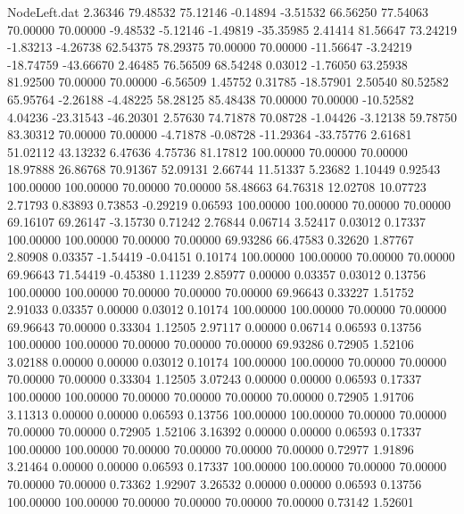 \begin{filecontents}{NodeLeft.dat}
   2.36346   79.48532   75.12146    -0.14894   -3.51532   66.56250   77.54063   70.00000   70.00000   -9.48532   -5.12146   -1.49819  -35.35985
   2.41414   81.56647   73.24219    -1.83213   -4.26738   62.54375   78.29375   70.00000   70.00000  -11.56647   -3.24219  -18.74759  -43.66670
   2.46485   76.56509   68.54248     0.03012   -1.76050   63.25938   81.92500   70.00000   70.00000   -6.56509    1.45752    0.31785  -18.57901
   2.50540   80.52582   65.95764    -2.26188   -4.48225   58.28125   85.48438   70.00000   70.00000  -10.52582    4.04236  -23.31543  -46.20301
   2.57630   74.71878   70.08728    -1.04426   -3.12138   59.78750   83.30312   70.00000   70.00000   -4.71878   -0.08728  -11.29364  -33.75776
   2.61681   51.02112   43.13232     6.47636    4.75736   81.17812  100.00000   70.00000   70.00000   18.97888   26.86768   70.91367   52.09131
   2.66744   11.51337    5.23682     1.10449    0.92543  100.00000  100.00000   70.00000   70.00000   58.48663   64.76318   12.02708   10.07723
   2.71793    0.83893    0.73853    -0.29219    0.06593  100.00000  100.00000   70.00000   70.00000   69.16107   69.26147   -3.15730    0.71242
   2.76844    0.06714    3.52417     0.03012    0.17337  100.00000  100.00000   70.00000   70.00000   69.93286   66.47583    0.32620    1.87767
   2.80908    0.03357   -1.54419    -0.04151    0.10174  100.00000  100.00000   70.00000   70.00000   69.96643   71.54419   -0.45380    1.11239
   2.85977    0.00000    0.03357     0.03012    0.13756  100.00000  100.00000   70.00000   70.00000   70.00000   69.96643    0.33227    1.51752
   2.91033    0.03357    0.00000     0.03012    0.10174  100.00000  100.00000   70.00000   70.00000   69.96643   70.00000    0.33304    1.12505
   2.97117    0.00000    0.06714     0.06593    0.13756  100.00000  100.00000   70.00000   70.00000   70.00000   69.93286    0.72905    1.52106
   3.02188    0.00000    0.00000     0.03012    0.10174  100.00000  100.00000   70.00000   70.00000   70.00000   70.00000    0.33304    1.12505
   3.07243    0.00000    0.00000     0.06593    0.17337  100.00000  100.00000   70.00000   70.00000   70.00000   70.00000    0.72905    1.91706
   3.11313    0.00000    0.00000     0.06593    0.13756  100.00000  100.00000   70.00000   70.00000   70.00000   70.00000    0.72905    1.52106
   3.16392    0.00000    0.00000     0.06593    0.17337  100.00000  100.00000   70.00000   70.00000   70.00000   70.00000    0.72977    1.91896
   3.21464    0.00000    0.00000     0.06593    0.17337  100.00000  100.00000   70.00000   70.00000   70.00000   70.00000    0.73362    1.92907
   3.26532    0.00000    0.00000     0.06593    0.13756  100.00000  100.00000   70.00000   70.00000   70.00000   70.00000    0.73142    1.52601

\end{filecontents}
